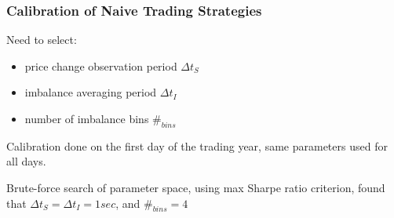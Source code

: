 \begin{frame}
\frametitle{Calibration of Naive Trading Strategies}
Need to select:
\begin{itemize}
\item price change observation period $\Delta t_S$
\item imbalance averaging period $\Delta t_I$
\item number of imbalance bins $\#_{bins}$
\end{itemize}
Calibration done on the first day of the trading year, same parameters used for all days.

Brute-force search of parameter space, using max Sharpe ratio criterion, found that $\Delta t_S = \Delta t_I = 1 sec$, and $\#_{bins} = 4$
\end{frame}

